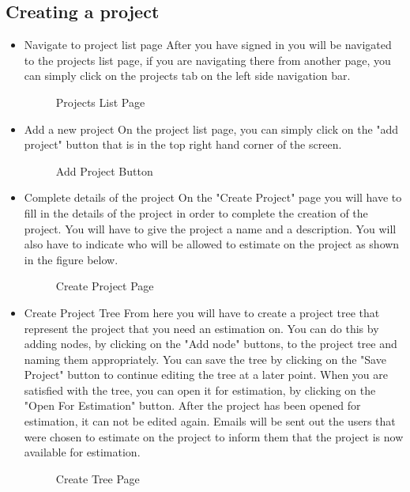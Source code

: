 \subsection{Creating a project}
\begin{itemize}
	\item{Navigate to project list page}
	\newline
	After you have signed in you will be navigated to the projects list page, if you are navigating there from another page, you can simply click on the projects tab on the left side navigation bar.
	\begin{figure}[H]
	    	\centering
	    	\caption{Projects List Page}
	    	\label{fig:Learning rate 0.1}
   	\end{figure}
	\item{Add a new project}
	\newline
	On the project list page, you can simply click on the "add project" button that is in the top right hand corner of the screen.
	\begin{figure}[H]
	    	\centering
	    	\caption{Add Project Button}
	    	\label{fig:Learning rate 0.1}
   	\end{figure}
	\item{Complete details of the project}
	\newline
	On the "Create Project" page you will have to fill in the details of the project in order to complete the creation of the project. You will have to give the project a name and a description. You will also have to indicate who will be allowed to estimate on the project as shown in the figure below.
	\begin{figure}[H]
	    	\centering
	    	\caption{Create Project Page}
	    	\label{fig:Learning rate 0.1}
   	\end{figure}
	\item{Create Project Tree}
	\newline
	From here you will have to create a project tree that represent the project that you need an estimation on. You can do this by adding nodes, by clicking on the "Add node" buttons, to the project tree and naming them appropriately. You can save the tree by clicking on the "Save Project" button to continue editing the tree at a later point. When you are satisfied with the tree, you can open it for estimation, by clicking on the "Open For Estimation" button. After the project has been opened for estimation, it can not be edited again. Emails will be sent out the users that were chosen to estimate on the project to inform them that the project is now available for estimation.
	\begin{figure}[H]
	    	\centering
	    	\caption{Create Tree Page}
	    	\label{fig:Learning rate 0.1}
   	\end{figure}
\end{itemize}